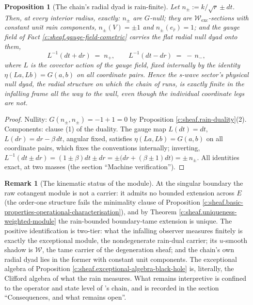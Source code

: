 \documentclass[11pt]{article}
\newtheorem{proposition}[theorem]{Proposition}
\theoremstyle{definition}
\newtheorem{remark}[theorem]{Remark}
\theoremstyle{plain}
\providecommand{\dtPG}{}\renewcommand{\dtPG}{dt}
\providecommand{\shW}{}\renewcommand{\shW}{\mathcal{W}}
\begin{document}
\begin{proposition}[The chain's radial dyad is rain-finite]\label{c:sheaf.chains-radial-dyad-rain-finite}
Let $n_\pm := k/\sqrt r \pm \dtPG$. Then, at every interior radius, exactly: $n_\pm$ are $G$-null; they are $\shW_{\mathrm{exc}}$-sections with \emph{constant unit} rain components, $n_\pm(V) = \pm 1$ and $n_\pm(e_{\hat r}) = 1$; and the gauge field of Fact \ref{c:sheaf.gauge-field-cometric} carries the flat radial null dyad onto them,
\[
L^{-1}(\dtPG + dr) \;=\; n_+, \qquad L^{-1}(\dtPG - dr) \;=\; -\,n_- ,
\]
where $L$ is the covector action of the gauge field, fixed internally by the identity $\eta(L a, L b) = G(a,b)$ on all coordinate pairs. Hence the s-wave sector's physical null dyad, the radial structure on which the chain of \cite{ButlerT5} runs, is exactly finite in the infalling frame all the way to the wall, even though the individual coordinate legs are not.
\end{proposition}
\begin{proof}
Nullity: $G(n_\pm, n_\pm) = -1 + 1 = 0$ by Proposition \ref{c:sheaf.rain-duality}(2). Components: clause (1) of the duality. The gauge map $L(\dtPG) = \dtPG$, $L(dr) = dr - \beta\,\dtPG$, angular fixed, satisfies $\eta(La, Lb) = G(a,b)$ on all coordinate pairs, which fixes the conventions internally; inverting, $L^{-1}(\dtPG \pm dr) = (1 \pm \beta)\dtPG \pm dr = \pm\bigl(dr + (\beta \pm 1)\dtPG\bigr) = \pm\,n_\pm$. All identities exact, at two masses (the section ``Machine verification'').

\end{proof}

\begin{remark}[The kinematic status of the module]\label{c:note.sheaf.kinematic-status-module}
At the singular boundary the raw cotangent module is not a carrier: it admits no bounded extension across $E$ (the order-one structure fails the minimality clause of Proposition \ref{c:sheaf.basic-properties-operational-characterisation}), and by Theorem \ref{c:sheaf.uniqueness-weighted-module} the rain-bounded boundary-tame extension is unique. The positive identification is two-tier: what the infalling observer measures finitely is exactly the exceptional module, the nondegenerate rain-dual carrier; its $u$-smooth shadow is $\shW$, the tame carrier of the degeneration sheaf; and the chain's own radial dyad lies in the former with constant unit components. The exceptional algebra of Proposition \ref{c:sheaf.exceptional-algebra-black-hole} is, literally, the Clifford algebra of what the rain measures. What remains interpretive is confined to the operator and state level of \cite{ButlerT5}'s chain, and is recorded in the section ``Consequences, and what remains open''.
\end{remark}
\end{document}
